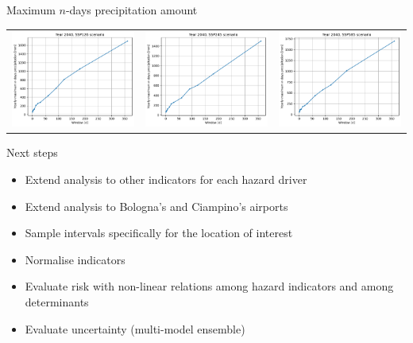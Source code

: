 \documentclass[aspectratio=169]{beamer}
\begin{document}
\begin{frame}{Maximum $n$-days precipitation amount}
  \begin{center}
    \begin{tabular}{ccc}
      \includegraphics[width=0.3\columnwidth]{max_n_day_precipitation_amount_ssp126} & \includegraphics[width=0.3\columnwidth]{max_n_day_precipitation_amount_ssp245} & \includegraphics[width=0.3\columnwidth]{max_n_day_precipitation_amount_ssp585}
    \end{tabular}
  \end{center}
\end{frame}



\begin{frame}{Next steps}
  \begin{itemize}
    \item Extend analysis to other indicators for each hazard driver
    \item Extend analysis to Bologna's and Ciampino's airports
    \item Sample intervals specifically for the location of interest
    \item Normalise indicators
    \item Evaluate risk with non-linear relations among hazard indicators and among determinants
    \item Evaluate uncertainty (multi-model ensemble)
  \end{itemize}
\end{frame}
\end{document}
